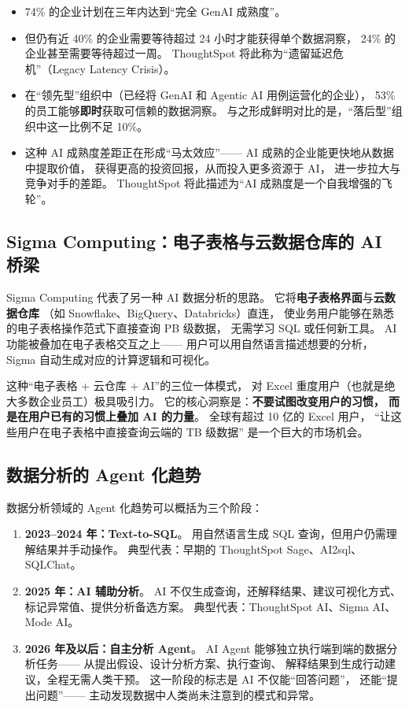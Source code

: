 \begin{itemize}[noitemsep]
  \item 74\% 的企业计划在三年内达到``完全 GenAI 成熟度''。
  \item 但仍有近 40\% 的企业需要等待超过 24 小时才能获得单个数据洞察，
        24\% 的企业甚至需要等待超过一周。
        ThoughtSpot 将此称为``遗留延迟危机''（Legacy Latency Crisis）。
  \item 在``领先型''组织中（已经将 GenAI 和 Agentic AI 用例运营化的企业），
        53\% 的员工能够\textbf{即时}获取可信赖的数据洞察。
        与之形成鲜明对比的是，``落后型''组织中这一比例不足 10\%。
  \item 这种 AI 成熟度差距正在形成``马太效应''——
        AI 成熟的企业能更快地从数据中提取价值，
        获得更高的投资回报，从而投入更多资源于 AI，
        进一步拉大与竞争对手的差距。
        ThoughtSpot 将此描述为``AI 成熟度是一个自我增强的飞轮''。
\end{itemize}

\subsection{Sigma Computing：电子表格与云数据仓库的 AI 桥梁}

Sigma Computing 代表了另一种 AI 数据分析的思路。
它将\textbf{电子表格界面}与\textbf{云数据仓库}
（如 Snowflake、BigQuery、Databricks）直连，
使业务用户能够在熟悉的电子表格操作范式下直接查询 PB 级数据，
无需学习 SQL 或任何新工具。
AI 功能被叠加在电子表格交互之上——
用户可以用自然语言描述想要的分析，
Sigma 自动生成对应的计算逻辑和可视化。

这种``电子表格 + 云仓库 + AI''的三位一体模式，
对 Excel 重度用户（也就是绝大多数企业员工）极具吸引力。
它的核心洞察是：\textbf{不要试图改变用户的习惯，
而是在用户已有的习惯上叠加 AI 的力量}。
全球有超过 10 亿的 Excel 用户，
``让这些用户在电子表格中直接查询云端的 TB 级数据''
是一个巨大的市场机会。

\subsection{数据分析的 Agent 化趋势}

数据分析领域的 Agent 化趋势可以概括为三个阶段：

\begin{enumerate}[noitemsep]
  \item \textbf{2023--2024 年：Text-to-SQL}。
        用自然语言生成 SQL 查询，但用户仍需理解结果并手动操作。
        典型代表：早期的 ThoughtSpot Sage、AI2sql、SQLChat。
  \item \textbf{2025 年：AI 辅助分析}。
        AI 不仅生成查询，还解释结果、建议可视化方式、
        标记异常值、提供分析备选方案。
        典型代表：ThoughtSpot AI、Sigma AI、Mode AI。
  \item \textbf{2026 年及以后：自主分析 Agent}。
        AI Agent 能够独立执行端到端的数据分析任务——
        从提出假设、设计分析方案、执行查询、
        解释结果到生成行动建议，全程无需人类干预。
        这一阶段的标志是 AI 不仅能``回答问题''，
        还能``提出问题''——
        主动发现数据中人类尚未注意到的模式和异常。
\end{enumerate}

